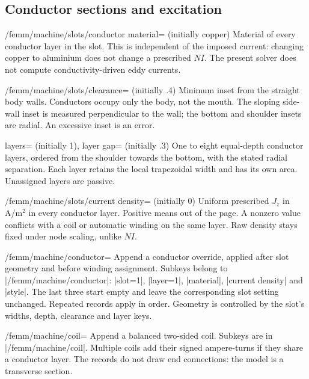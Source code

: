\subsection{Conductor sections and excitation}
\begin{key}{/femm/machine/slots/conductor material= (initially copper)}
Material of every conductor layer in the slot. This is independent of the
imposed current: changing copper to aluminium does not change a prescribed
$NI$. The present solver does not compute conductivity-driven eddy currents.
\end{key}
\begin{key}{/femm/machine/slots/clearance= (initially .4)}
Minimum inset from the straight body walls. Conductors occupy only the body,
not the mouth. The sloping side-wall inset is measured perpendicular to the
wall; the bottom and shoulder insets are radial. An excessive inset is an error.
\end{key}
\begin{keylist}{layers= (initially 1),
 layer gap= (initially .3)}
One to eight equal-depth conductor layers, ordered from the shoulder towards
the bottom, with the stated radial separation. Each layer retains the local
trapezoidal width and has its own area. Unassigned layers are passive.
\end{keylist}
\begin{key}{/femm/machine/slots/current density= (initially 0)}
Uniform prescribed $J_z$ in A/m$^2$ in every conductor layer. Positive means
out of the page. A nonzero value conflicts with a coil or automatic winding
on the same layer. Raw density stays fixed under node scaling, unlike $NI$.
\end{key}
\begin{key}{/femm/machine/conductor=}
Append a conductor override, applied after slot geometry and before winding
assignment. Subkeys belong to |/femm/machine/conductor|: |slot=1|, |layer=1|,
|material|, |current density| and |style|. The last three start empty and leave
the corresponding slot setting unchanged. Repeated records apply in order.
Geometry is controlled by the slot's widths, depth, clearance and layer keys.
\end{key}
\begin{key}{/femm/machine/coil=}
Append a balanced two-sided coil. Subkeys are in |/femm/machine/coil|.
Multiple coils add their signed ampere-turns if they share a conductor layer.
The records do not draw end connections: the model is a transverse section.
\end{key}
